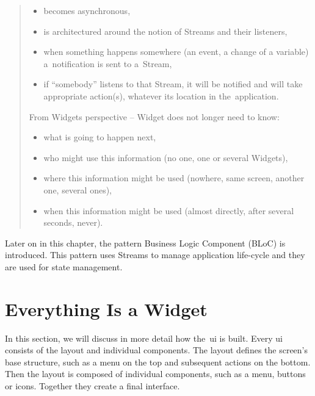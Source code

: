 \begin{quote}
    \begin{itemize}
        \item becomes asynchronous,
        \item is architectured around the notion of Streams and their listeners,
        \item when something happens somewhere (an event, a change of a variable) a~notification is sent to a~Stream,
        \item if ``somebody'' listens to that Stream, it will be notified and will take appropriate action(s), whatever its location in the~application.
    \end{itemize}
    
    From Widgets perspective -- Widget does not longer need to know:
    
    \begin{itemize}
        \item what is going to happen next,
        \item who might use this information (no one, one or several Widgets),
        \item where this information might be used (nowhere, same screen, another one, several ones),
        \item when this information might be used (almost directly, after several seconds, never).
    \end{itemize}
\end{quote}

Later on in this chapter, the pattern Business Logic Component (BLoC) is introduced. This pattern uses Streams to manage application life-cycle and they are used for state management.
\section{Everything Is a Widget}
In this section, we will discuss in more detail how the~\gls{ui} is built. Every \gls{ui} consists of the layout and individual components. The layout defines the screen's base structure, such as a menu on the top and subsequent actions on the bottom. Then the layout is composed of individual components, such as a menu, buttons or icons. Together they create a final interface.

